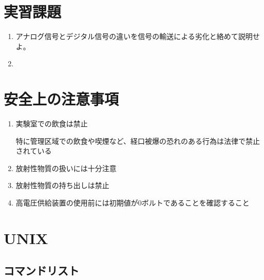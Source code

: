 \documentclass{jarticle}
\begin{document}
 
 	  \section{実習課題}

 	  \begin{enumerate}
	   \item アナログ信号とデジタル信号の違いを信号の輸送による劣化と絡めて説明せよ。
		 
	   \item 
	  \end{enumerate}
	  
	  
	  
 \section{安全上の注意事項}
 	  \begin{enumerate}
	   \item 実験室での飲食は禁止
		 
		 特に管理区域での飲食や喫煙など、経口被爆の恐れのある行為は法律で禁止されている
		 
	   \item 放射性物質の扱いには十分注意

	   \item 放射性物質の持ち出しは禁止

	   \item 高電圧供給装置の使用前には初期値が0ボルトであることを確認すること
		 
		
	  \end{enumerate}
	  

	  
	  
	  
\clearpage

\appendix 
	  
	  
 \section{UNIX}
	  
  \subsection*{コマンドリスト}
	  
\end{document}

